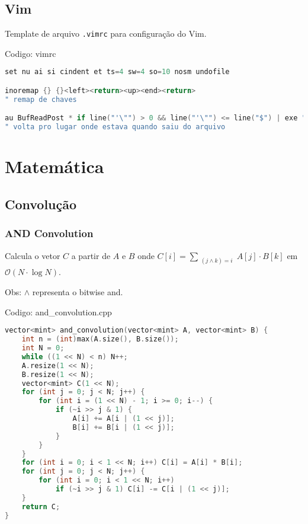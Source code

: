 \documentclass[10pt, a4paper, oneside]{book}
\begin{document}
\section{Vim}


Template de arquivo \texttt{.vimrc} para configuração do Vim.

\hfill

Codigo: vimrc

\begin{lstlisting}[language=C++]
set nu ai si cindent et ts=4 sw=4 so=10 nosm undofile

inoremap {} {}<left><return><up><end><return>
" remap de chaves

au BufReadPost * if line("'\"") > 0 && line("'\"") <= line("$") | exe "normal! g'\"" | endif
" volta pro lugar onde estava quando saiu do arquivo
\end{lstlisting}
\hfill

\newpage

%
%
%
%

\chapter{Matemática}

\section{Convolução}
\subsection{AND Convolution}


Calcula o vetor $C$ a partir de $A$ e $B$ onde $C[i] = \sum_{\substack{(j \land k) = i}} A[j] \cdot B[k]$ em $\mathcal{O}(N \cdot \log N)$.



Obs: $\land$ representa o bitwise and.

\hfill

Codigo: and\_convolution.cpp

\begin{lstlisting}[language=C++]
vector<mint> and_convolution(vector<mint> A, vector<mint> B) {
    int n = (int)max(A.size(), B.size());
    int N = 0;
    while ((1 << N) < n) N++;
    A.resize(1 << N);
    B.resize(1 << N);
    vector<mint> C(1 << N);
    for (int j = 0; j < N; j++) {
        for (int i = (1 << N) - 1; i >= 0; i--) {
            if (~i >> j & 1) {
                A[i] += A[i | (1 << j)];
                B[i] += B[i | (1 << j)];
            }
        }
    }
    for (int i = 0; i < 1 << N; i++) C[i] = A[i] * B[i];
    for (int j = 0; j < N; j++) {
        for (int i = 0; i < 1 << N; i++)
            if (~i >> j & 1) C[i] -= C[i | (1 << j)];
    }
    return C;
}
\end{lstlisting}
\hfill
\end{document}
